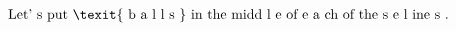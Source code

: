 \documentclass[preview]{standalone}
\begin{document}
\begin{align*}
\text{Let' s  put \texit{ b a l l s } in the midd l e of e a ch of the s e  l ine s .}
\end{align*}
\end{document}

